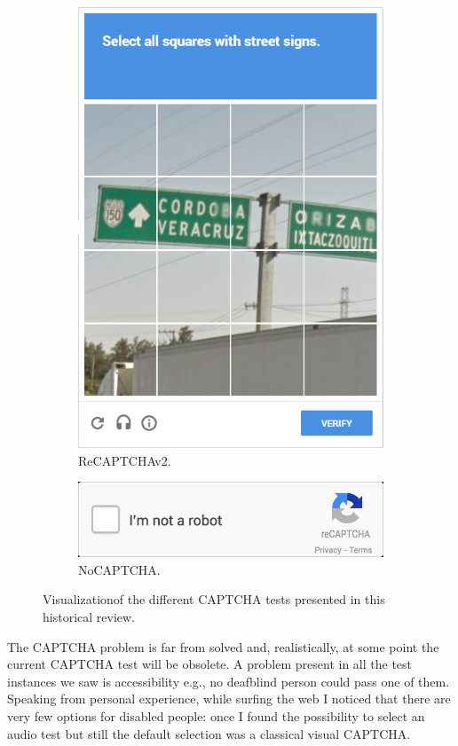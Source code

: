 \begin{figure}[h!t]
\begin{subfigure}{0.49\textwidth}
        \includegraphics[scale=0.25]{assets/images/recaptchav2.png}
        \caption{ReCAPTCHAv2.}
        \label{fig:captcha:recatpchav2}
    \end{subfigure}
    \begin{subfigure}{0.49\textwidth}
        \centering
        \includegraphics[scale=0.25]{assets/images/nocaptcha.jpg}
        \caption{NoCAPTCHA.}
        \label{fig:captcha:nocatpcha}
    \end{subfigure}
    \caption{Visualizationof the different CAPTCHA tests presented in this historical review.}
    \label{fig:captcha}
\end{figure}

The CAPTCHA problem is far from solved and, realistically, at some point the current CAPTCHA test will be obsolete.
A problem present in all the test instances we saw is accessibility e.g., no deafblind person could pass one of them.
Speaking from personal experience, while surfing the web I noticed that there are very few options for disabled people: once I found the possibility to select an audio test but still the default selection was a classical visual CAPTCHA.